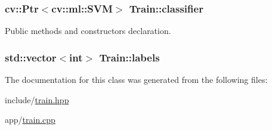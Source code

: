 \subsubsection[{\texorpdfstring{classifier}{classifier}}]{\setlength{\rightskip}{0pt plus 5cm}cv\+::\+Ptr$<$cv\+::ml\+::\+S\+VM$>$ Train\+::classifier}\hypertarget{classTrain_af48556029dbb829b97e52a47c38f5dec}{}\label{classTrain_af48556029dbb829b97e52a47c38f5dec}


Public methods and constructors declaration. 

\subsubsection[{\texorpdfstring{labels}{labels}}]{\setlength{\rightskip}{0pt plus 5cm}std\+::vector$<$int$>$ Train\+::labels}\hypertarget{classTrain_a94e850beee52059be00a4fd9068cb223}{}\label{classTrain_a94e850beee52059be00a4fd9068cb223}


The documentation for this class was generated from the following files\+:\begin{DoxyCompactItemize}
\item 
include/\hyperlink{train_8hpp}{train.\+hpp}\item 
app/\hyperlink{train_8cpp}{train.\+cpp}\end{DoxyCompactItemize}
